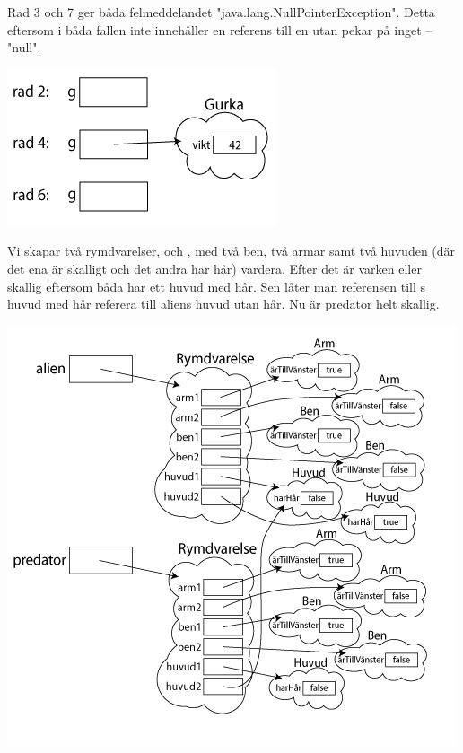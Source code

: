 
\ExerciseSolution{\ExeWeekFIVE}

\BasicTasks %

\Task %

\Subtask Rad 3 och 7 ger båda felmeddelandet "java.lang.NullPointerException". Detta eftersom  i båda fallen inte innehåller en referens till en  utan pekar på inget -- "null".

\Subtask \includegraphics[scale=0.6]{../img/w06-solutions/1b}

\Task %

\Subtask Vi skapar två rymdvarelser,  och , med två ben, två armar samt två huvuden (där det ena är skalligt och det andra har hår) vardera. Efter det är varken  eller  skallig eftersom båda har ett huvud med hår. Sen låter man referensen till s huvud med hår referera till aliens huvud utan hår. Nu är predator helt skallig.

\Subtask  \includegraphics[scale=0.7]{../img/w06-solutions/2b}

